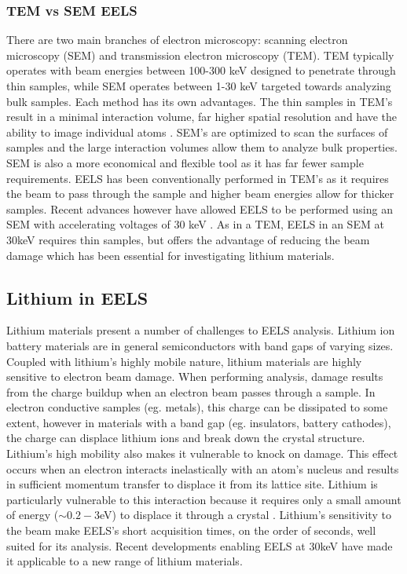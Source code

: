 \subsubsection{TEM vs SEM EELS}
There are two main branches of electron microscopy: scanning electron microscopy (SEM) and transmission electron microscopy (TEM).  TEM typically operates with beam energies between 100-300 keV designed to penetrate through thin samples, while SEM operates between 1-30 keV targeted towards analyzing bulk samples.  Each method has its own advantages.  The thin samples in TEM's result in a minimal interaction volume, far higher spatial resolution and have the ability to image individual atoms \cite{hansen_atomic-resolution_2001}. SEM's are optimized to scan the surfaces of samples and the large interaction volumes allow them to analyze bulk properties.  SEM is also a more economical and flexible tool as it has far fewer sample requirements.   EELS has been conventionally performed in TEM's as it requires the beam to pass through the sample and higher beam energies allow for thicker samples. Recent advances however have allowed EELS to be performed using an SEM with accelerating voltages of 30 keV \cite{SU_9000}.  As in a TEM, EELS in an SEM at 30keV requires thin samples, but offers the advantage of reducing the beam damage which has been essential for investigating lithium materials. 



\subsection{Lithium in EELS}
Lithium materials present a number of challenges to EELS analysis.  Lithium ion battery materials are in general semiconductors with band gaps of varying sizes. Coupled with lithium's highly mobile nature, lithium materials are highly sensitive to electron beam damage.  When performing analysis, damage results from the charge buildup when an electron beam passes through a sample.  In electron conductive samples (eg. metals), this charge can be dissipated to some extent, however in materials with a band gap (eg. insulators, battery cathodes), the charge can displace lithium ions and break down the crystal structure.  Lithium's high mobility also makes it vulnerable to knock on damage.  This effect occurs when an electron interacts inelastically with an atom's nucleus and results in sufficient momentum transfer to displace it from its lattice site.  Lithium is particularly vulnerable to this interaction because it requires only a small amount of energy ($ \sim 0.2-3$eV) to displace it through a crystal \cite{kang_factors_2006}.  Lithium's sensitivity to the beam make EELS's short acquisition times, on the order of seconds, well suited for its analysis. Recent developments enabling EELS at 30keV have made it applicable to a new range of lithium materials.\\  

